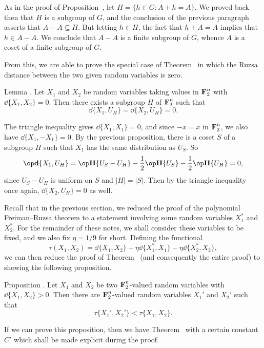 As in the proof
of Proposition~{\propdoublingone}, let $H = \{h\in G : A+h = A\}$. We proved back then that $H$ is a subgroup
of $G$, and the conclusion of the previous paragraph
asserts that $A-A \subseteq H$. But letting $h\in H$, the fact that
$h+A = A$ implies that $h\in A-A$. We conclude that
$A-A$ is a finite subgroup of $G$, whence $A$ is a coset of a finite subgroup of $G$.\slug

From this, we are able to prove the special case of Theorem~{\thmsubgroup} in which the Ruzsa distance between
the two given random variables is zero.

\edef\lemzerosubgroup{\the\sectcount.\the\thmcount}
\proclaim Lemma \advthm. Let $X_1$ and $X_2$ be random variables taking values in $\hbox{\bf F}_2^n$ with
$\dd\{X_1,X_2\} = 0$. Then there exists a subgroup $H$ of $\hbox{\bf F}_2^n$ such that
$$\dd\{X_1, U_H\} = \dd\{X_2,U_H\} = 0.$$

\proof The triangle inequality gives $\dd\{X_1,X_1\} = 0$, and since $-x = x$ in $\hbox{\bf F}_2^n$,
we also have $\dd\{X_1, - X_1\} = 0$. By the previous proposition, there is a coset $S$ of a
subgroup $H$ such that
$X_1$ has the same distribution as $U_S$. So
$$\dd\{X_1, U_H\} = \Eta\{U_S - U_H\} - {1\over 2}\Eta\{U_S\} - {1\over 2}\Eta\{U_H\} = 0,$$
since $U_S-U_H$ is uniform on $S$ and $|H| = |S|$. Then by the triangle inequality once again,
$\dd\{X_2, U_H\} = 0$ as well.\slug

Recall that in the previous section, we reduced the proof of the polynomial Freiman--Ruzsa theorem
to a statement involving some random variables $X_1^*$ and $X_2^*$. For the remainder of these notes,
we shall consider these variables to be fixed, and we also fix $\eta = 1/9$ for short.
Defining the functional
$$\tau(X_1, X_2) = \dd\{X_1, X_2\} - \eta\dd\{X_1^*, X_1\} - \eta\dd\{X_2^*, X_2\},$$
we can then reduce the proof of Theorem~{\thmsubgroup} (and consequently the entire proof) to showing the
following proposition.

\edef\propmaintau{\the\sectcount.\the\thmcount}
\proclaim Proposition \advthm. Let $X_1$ and $X_2$ be two $\hbox{\bf F}_2^n$-valued random variables with
$\dd\{ X_1, X_2\} > 0$. Then there are $\hbox{\bf F}_2^n$-valued random variables $X_1'$ and $X_2'$ such that
$$\tau\{X_1', X_2'\} < \tau\{X_1, X_2\}.$$

If we can prove this proposition, then we have Theorem~{\thmsubgroup} with a certain constant $C'$ which
shall be made explicit during the proof.


